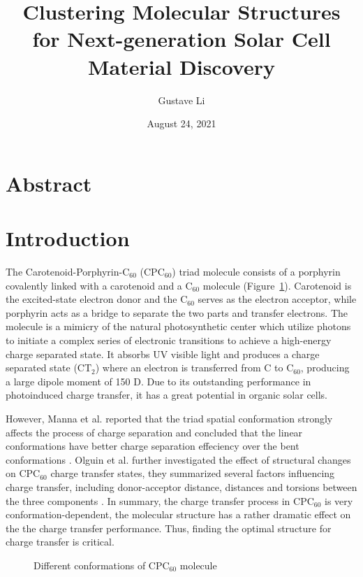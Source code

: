 \documentclass[a4paper]{article}
\title{Clustering Molecular Structures for Next-generation Solar Cell Material Discovery}
\author{Gustave Li}
\date{August 24, 2021}
\begin{document}
\maketitle

\section{Abstract}

\section{Introduction}
The Carotenoid-Porphyrin-\(\text{C}_{60}\) (\(\text{CPC}_{60}\)) triad molecule consists of a porphyrin covalently linked with a carotenoid and a \(\text{C}_{60}\) molecule (Figure~\ref{fig:CPC60}). Carotenoid is the excited-state electron donor and the \(\text{C}_{60}\) serves as the electron acceptor, while porphyrin acts as a bridge to separate the two parts and transfer electrons. The molecule is a mimicry of the natural photosynthetic center which utilize photons to initiate a complex series of electronic transitions to achieve a high-energy charge separated state. It absorbs UV visible light and produces a charge separated state (\(\text{CT}_{2}\)) where an electron is transferred from C to \(\text{C}_{60}\), producing a large dipole moment of 150 D. Due to its outstanding performance in photoinduced charge transfer, it has a great potential in organic solar cells.

However, Manna et al. reported that the triad spatial conformation strongly affects the process of charge separation and concluded that the linear conformations have better charge separation effeciency over the bent conformations \cite{MannaArun}. Olguin et al. further investigated the effect of structural changes on \(\text{CPC}_{60}\) charge transfer states, they summarized several factors influencing charge transfer, including donor-acceptor distance, distances and torsions between the three components \cite{OlguinMarco}. In summary, the charge transfer process in \(\text{CPC}_{60}\) is very conformation-dependent,  the molecular structure has a rather dramatic effect on the the charge transfer performance. Thus, finding the optimal structure for charge transfer is critical.

\begin{figure}[H]
    \centering
    \caption{Different conformations of \(\text{CPC}_{60}\) molecule}
    \label{fig:CPC60}
\end{figure}
\end{document}
